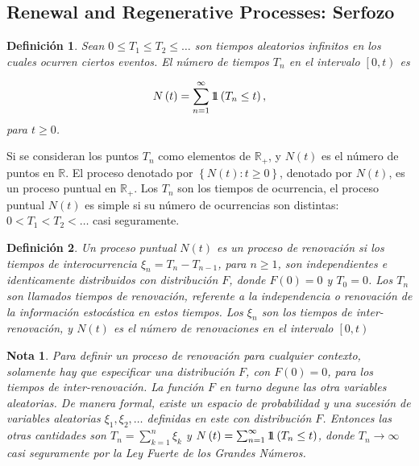 \documentclass{article}
\newtheorem{Def}{Definición}
\newtheorem{Note}{Nota}
\newcommand{\rea}{\mathbb{R}}
\newcommand{\indora}{\mbox{$1$\hspace{-0.8ex}$1$}}
\begin{document}
%
\subsection{Renewal and Regenerative Processes: Serfozo\cite{Serfozo}}
%
\begin{Def}\label{Def.Tn}
Sean $0\leq T_{1}\leq T_{2}\leq \ldots$ son tiempos aleatorios infinitos en los cuales ocurren ciertos eventos. El n\'umero de tiempos $T_{n}$ en el intervalo $\left[0,t\right)$ es

\begin{eqnarray}
N\left(t\right)=\sum_{n=1}^{\infty}\indora\left(T_{n}\leq t\right),
\end{eqnarray}
para $t\geq0$.
\end{Def}

Si se consideran los puntos $T_{n}$ como elementos de $\rea_{+}$, y $N\left(t\right)$ es el n\'umero de puntos en $\rea$. El proceso denotado por $\left\{N\left(t\right):t\geq0\right\}$, denotado por $N\left(t\right)$, es un proceso puntual en $\rea_{+}$. Los $T_{n}$ son los tiempos de ocurrencia, el proceso puntual $N\left(t\right)$ es simple si su n\'umero de ocurrencias son distintas: $0<T_{1}<T_{2}<\ldots$ casi seguramente.

\begin{Def}
Un proceso puntual $N\left(t\right)$ es un proceso de renovaci\'on si los tiempos de interocurrencia $\xi_{n}=T_{n}-T_{n-1}$, para $n\geq1$, son independientes e identicamente distribuidos con distribuci\'on $F$, donde $F\left(0\right)=0$ y $T_{0}=0$. Los $T_{n}$ son llamados tiempos de renovaci\'on, referente a la independencia o renovaci\'on de la informaci\'on estoc\'astica en estos tiempos. Los $\xi_{n}$ son los tiempos de inter-renovaci\'on, y $N\left(t\right)$ es el n\'umero de renovaciones en el intervalo $\left[0,t\right)$
\end{Def}


\begin{Note}
Para definir un proceso de renovaci\'on para cualquier contexto, solamente hay que especificar una distribuci\'on $F$, con $F\left(0\right)=0$, para los tiempos de inter-renovaci\'on. La funci\'on $F$ en turno degune las otra variables aleatorias. De manera formal, existe un espacio de probabilidad y una sucesi\'on de variables aleatorias $\xi_{1},\xi_{2},\ldots$ definidas en este con distribuci\'on $F$. Entonces las otras cantidades son $T_{n}=\sum_{k=1}^{n}\xi_{k}$ y $N\left(t\right)=\sum_{n=1}^{\infty}\indora\left(T_{n}\leq t\right)$, donde $T_{n}\rightarrow\infty$ casi seguramente por la Ley Fuerte de los Grandes N\'umeros.
\end{Note}
\end{document}
